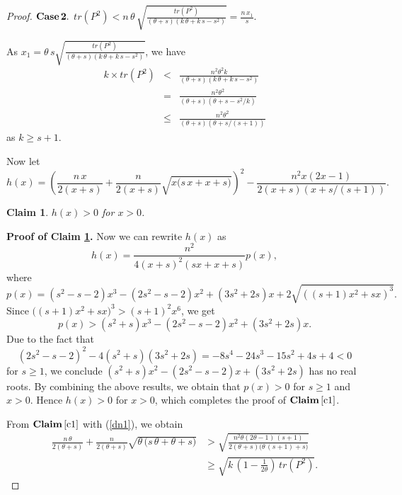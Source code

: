\documentclass[12pt]{article}
\newtheorem{claim}{Claim}
\begin{document}
\begin{proof}
\noindent
${\bf Case\,2.}$ $tr(P^2)<n\,\theta\,\sqrt{\displaystyle{\frac{tr(P^2)}{(\theta+s)(k\,\theta+k\,s-s^2)}}}=\displaystyle{\frac{n\,x_1}{s}}$. 

\vspace*{3mm}

As $x_1= \theta\,s\sqrt{\displaystyle{\frac{tr(P^2)}{(\theta+s)(k\,\theta+k\,s-s^2)}}}$, we have
    \begin{eqnarray}
  k\times tr(P^2)&<&\frac{n^2{\theta}^2k}{(\theta+s)(k\,\theta+k\,s-s^2)}\nonumber\\[2mm]
   &=&\frac{n^2{\theta}^2}{(\theta+s)(\theta+s-s^2/k)}\nonumber\\[2mm]
   &\leq &\frac{n^2{\theta}^2}{(\theta+s)(\theta+s/(s+1))} \label{dn1}
 \end{eqnarray}
as $k\geq s+1$. 

\vspace*{3mm}

Now let
 $$h(x)=\left(\frac{n\,x}{2(x+s)}+\frac{n}{2(x+s)}\sqrt{x\big(s\,x+x+s\big)}\right)^2-\frac{n^2x(2x-1)}{2(x+s)(x+s/(s+1))}.$$

 \vspace*{3mm}

\begin{claim}\label{c1} $h(x)>0$ for $x>0$.
\end{claim}

\vspace*{3mm}

\noindent
{\bf Proof of Claim \ref{c1}.} Now we can rewrite $h(x)$ as
   $$h(x)=\frac{n^2}{4(x+s)^2(sx+x+s)}p(x),$$ 
where
   $$ p(x)=(s^2-s-2)x^3-(2s^2-s-2)x^2+(3s^2+2s)x+2\sqrt{((s+1)x^2+sx)^3}.$$
Since $\Big((s+1)x^2+sx\Big)^3>(s+1)^2x^6$, we get 
 $$p(x)>(s^2+s)x^3-(2s^2-s-2)x^2+(3s^2+2s)x.$$
Due to the fact that 
$$(2s^2-s-2)^2-4(s^2+s)(3s^2+2s)=-8s^4 - 24s^3 - 15s^2 + 4s + 4<0$$ 
for $s\geq 1$, we conclude $(s^2+s)x^2-(2s^2-s-2)x+(3s^2+2s)$ has no real roots. By combining the above results, we obtain that $p(x)>0$ for $s\geq 1$ and $x>0$. 
Hence $h(x)>0$ for $x>0$,  which completes the proof of  ${\bf Claim\,\ref{c1}}$.
 
\vspace*{3mm}

From ${\bf Claim\,\ref{c1}}$ with (\ref{dn1}), we obtain
\begin{align}
\frac{n\,\theta}{2(\theta+s)}+\frac{n}{2(\theta+s)}\sqrt{\theta\,\Big(s\,\theta+\theta+s\Big)}&>\sqrt{\frac{n^2\theta(2\theta-1)\,(s+1)}{2(\theta+s)\Big(\theta\,(s+1)+s\Big)}}\nonumber\\[3mm]
&\geq \sqrt{k\,\left(1-\frac{1}{2\theta}\right)\,tr(P^2)}.\label{kcd1}
\end{align}


\end{proof}
\end{document}
